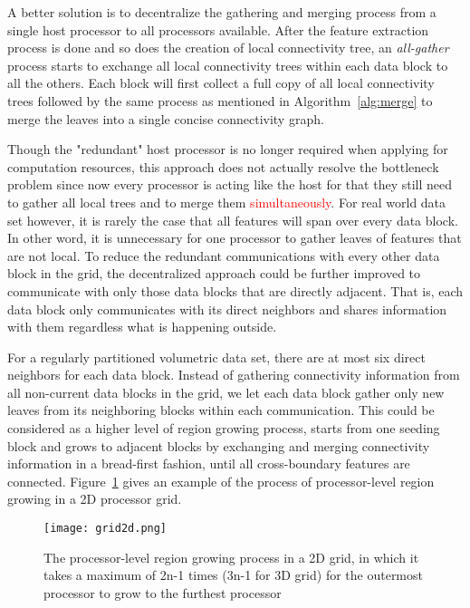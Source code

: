 A better solution is to decentralize the gathering and merging process from a single host processor to all processors available. After the feature extraction process is done and so does the creation of local connectivity tree, an \emph{all-gather} process starts to exchange all local connectivity trees within each data block to all the others. Each block will first collect a full copy of all local connectivity trees followed by the same process as mentioned in Algorithm~\ref{alg:merge} to merge the leaves into a single concise connectivity graph.

Though the "redundant" host processor is no longer required when applying for computation resources, this approach does not actually resolve the bottleneck problem since now every processor is acting like the host for that they still need to gather all local trees and to merge them \textcolor{red}{simultaneously}. For real world data set however, it is rarely the case that all features will span over every data block. In other word, it is unnecessary for one processor to gather leaves of features that are not local. To reduce the redundant communications with every other data block in the grid, the decentralized approach could be further improved to communicate with only those data blocks that are directly adjacent. That is, each data block only communicates with its direct neighbors and shares information with them regardless what is happening outside.

For a regularly partitioned volumetric data set, there are at most six direct neighbors for each data block. Instead of gathering connectivity information from all non-current data blocks in the grid, we let each data block gather only new leaves from its neighboring blocks within each communication. This could be considered as a higher level of region growing process, starts from one seeding block and grows to adjacent blocks by exchanging and merging connectivity information in a bread-first fashion, until all cross-boundary features are connected. Figure~\ref{fig:grid2d} gives an example of the process of processor-level region growing in a 2D processor grid.

\begin{figure}[ht]
	\centering
	\texttt{[image: grid2d.png]}
	\caption{The processor-level region growing process in a 2D grid, in which it takes a maximum of 2n-1 times (3n-1 for 3D grid) for the outermost processor to grow to the furthest processor}
	\label{fig:grid2d}
\end{figure}

